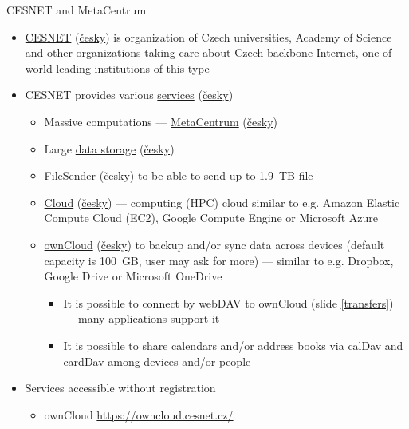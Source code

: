 \documentclass[compress, ucs, xelatex, 11pt, xcolor=svgnames, aspectratio=169,
	hyperref={
		bookmarks=true,
		unicode=true,
		colorlinks=true,
		pdftitle={Linux, command line and MetaCentrum},
		plainpages=false,
		pdfauthor={Vojtech Zeisek},
		pdfsubject={Course about use of Linux command line, writing shell scripts and using MetaCentrum of CESNET},
		pdfcreator={XeLaTeX},
		pdfkeywords={Linux, GNU, BASH, shell, command line, MetaCentrum},
		linkcolor=DarkRed, %
		anchorcolor=DarkBlue, %
		citecolor=Indigo, %
		filecolor=NavyBlue, %
		menucolor=DarkMagenta, %
		urlcolor=DarkBlue, %
		pdftex},
	url={hyphens, lowtilde} %
	]{beamer}
\begin{document}
\begin{frame}[allowframebreaks]{CESNET and MetaCentrum}
	\label{CESNET}
	\begin{itemize}
		\item \href{https://www.cesnet.cz/?lang=en}{CESNET} (\href{https://www.cesnet.cz/}{česky}) is organization of Czech universities, Academy of Science and other organizations taking care about Czech backbone Internet, one of world leading institutions of this type
		\item CESNET provides various \href{https://www.cesnet.cz/services/?lang=en}{services} (\href{https://www.cesnet.cz/sluzby/}{česky})
		\begin{itemize}
			\item Massive computations --- \href{https://www.cesnet.cz/services/massive-computations-metacentrum/?lang=en}{MetaCentrum} (\href{https://www.cesnet.cz/sluzby/metacentrum/}{česky})
			\item Large \href{https://www.cesnet.cz/services/data-storage/?lang=en}{data storage} (\href{https://www.cesnet.cz/sluzby/datova-uloziste/}{česky})
			\item \href{https://www.cesnet.cz/services/filesender/?lang=en}{FileSender} (\href{https://www.cesnet.cz/sluzby/filesender/}{česky}) to be able to send up to 1.9~TB file
			\item \href{https://www.metacentrum.cz/en/Sluzby/Cloud/}{Cloud} (\href{https://www.metacentrum.cz/cs/Sluzby/Cloud/}{česky}) --- computing (HPC) cloud similar to e.g. Amazon Elastic Compute Cloud (EC2), Google Compute Engine or Microsoft Azure
			\item \href{https://www.cesnet.cz/services/owncloud/?lang=en}{ownCloud} (\href{https://www.cesnet.cz/sluzby/owncloud/}{česky}) to backup and/or sync data across devices (default capacity is 100~GB, user may ask for more) --- similar to e.g. Dropbox, Google Drive or Microsoft OneDrive
			\begin{itemize}
				\item It is possible to connect by webDAV to ownCloud (slide \ref{transfers}) --- many applications support it
				\item It is possible to share calendars and/or address books via calDav and cardDav among devices and/or people
			\end{itemize}
		\end{itemize}
		\item Services accessible without registration
		\begin{itemize}
			\item ownCloud \url{https://owncloud.cesnet.cz/}

\end{itemize}
\end{itemize}
\end{frame}
\end{document}

